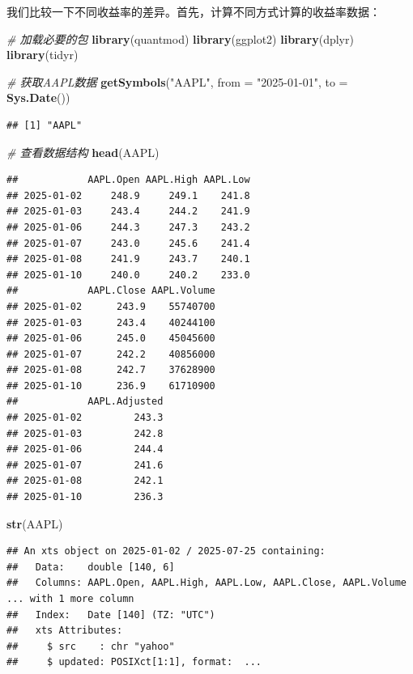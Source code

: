\documentclass[]{ctexbook}
\newenvironment{Shaded}{\begin{snugshade}}{\end{snugshade}}
\newcommand{\AttributeTok}[1]{\textcolor[rgb]{0.13,0.29,0.53}{#1}}
\newcommand{\CommentTok}[1]{\textcolor[rgb]{0.56,0.35,0.01}{\textit{#1}}}
\newcommand{\FunctionTok}[1]{\textcolor[rgb]{0.13,0.29,0.53}{\textbf{#1}}}
\newcommand{\NormalTok}[1]{#1}
\newcommand{\StringTok}[1]{\textcolor[rgb]{0.31,0.60,0.02}{#1}}
\begin{document}
我们比较一下不同收益率的差异。首先，计算不同方式计算的收益率数据：

\begin{Shaded}
\begin{Highlighting}[]
\CommentTok{\# 加载必要的包}
\FunctionTok{library}\NormalTok{(quantmod)}
\FunctionTok{library}\NormalTok{(ggplot2)}
\FunctionTok{library}\NormalTok{(dplyr)}
\FunctionTok{library}\NormalTok{(tidyr)}

\CommentTok{\# 获取AAPL数据}
\FunctionTok{getSymbols}\NormalTok{(}\StringTok{"AAPL"}\NormalTok{, }\AttributeTok{from =} \StringTok{"2025{-}01{-}01"}\NormalTok{, }\AttributeTok{to =} \FunctionTok{Sys.Date}\NormalTok{())}
\end{Highlighting}
\end{Shaded}

\begin{verbatim}
## [1] "AAPL"
\end{verbatim}

\begin{Shaded}
\begin{Highlighting}[]
\CommentTok{\# 查看数据结构}
\FunctionTok{head}\NormalTok{(AAPL)}
\end{Highlighting}
\end{Shaded}

\begin{verbatim}
##            AAPL.Open AAPL.High AAPL.Low
## 2025-01-02     248.9     249.1    241.8
## 2025-01-03     243.4     244.2    241.9
## 2025-01-06     244.3     247.3    243.2
## 2025-01-07     243.0     245.6    241.4
## 2025-01-08     241.9     243.7    240.1
## 2025-01-10     240.0     240.2    233.0
##            AAPL.Close AAPL.Volume
## 2025-01-02      243.9    55740700
## 2025-01-03      243.4    40244100
## 2025-01-06      245.0    45045600
## 2025-01-07      242.2    40856000
## 2025-01-08      242.7    37628900
## 2025-01-10      236.9    61710900
##            AAPL.Adjusted
## 2025-01-02         243.3
## 2025-01-03         242.8
## 2025-01-06         244.4
## 2025-01-07         241.6
## 2025-01-08         242.1
## 2025-01-10         236.3
\end{verbatim}

\begin{Shaded}
\begin{Highlighting}[]
\FunctionTok{str}\NormalTok{(AAPL)}
\end{Highlighting}
\end{Shaded}

\begin{verbatim}
## An xts object on 2025-01-02 / 2025-07-25 containing: 
##   Data:    double [140, 6]
##   Columns: AAPL.Open, AAPL.High, AAPL.Low, AAPL.Close, AAPL.Volume ... with 1 more column
##   Index:   Date [140] (TZ: "UTC")
##   xts Attributes:
##     $ src    : chr "yahoo"
##     $ updated: POSIXct[1:1], format:  ...
\end{verbatim}
\end{document}
